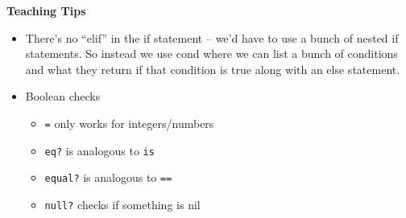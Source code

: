 \begin{guide}
\begin{blocksection}
\textbf{Teaching Tips}
\begin{itemize}
    \item There’s no “elif” in the if statement -- we’d have to use a bunch of nested if statements. So instead we use cond where we can list a bunch of conditions and what they return if that condition is true along with an else statement.
    \item Boolean checks
        \begin{itemize}
        \item \lstinline{=} only works for integers/numbers
        \item \lstinline{eq?} is analogous to \lstinline{is}
        \item \lstinline{equal?} is analogous to \lstinline{==}
        \item \lstinline{null?} checks if something is nil
        \end{itemize}
\end{itemize}
\end{blocksection}
\end{guide}
